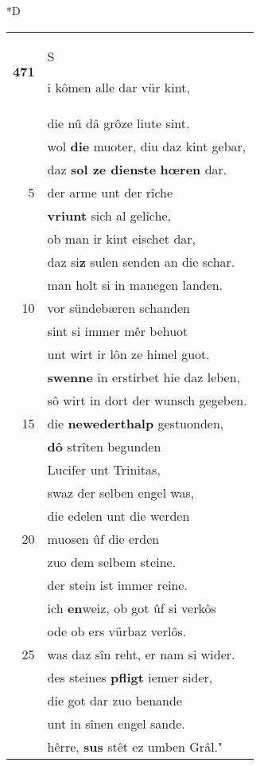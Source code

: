 \documentclass[8pt,a4paper,notitlepage]{article}
\begin{document}
\begin{table}[ht]
\begin{minipage}[t]{0.5\linewidth}
\small
\begin{center}*D
\end{center}
\begin{tabular}{rl}
\textbf{471} & \begin{large}S\end{large}i kômen alle dar vür kint,\\ 
 & die nû dâ grôze liute sint.\\ 
 & wol \textbf{die} muoter, diu daz kint gebar,\\ 
 & daz \textbf{sol ze dienste} \textbf{hœren} dar.\\ 
5 & der arme unt der rîche\\ 
 & \textbf{vriunt} sich al gelîche,\\ 
 & ob man ir kint eischet dar,\\ 
 & daz si\textbf{z} sulen senden an die schar.\\ 
 & man holt si in manegen landen.\\ 
10 & vor sündebæren schanden\\ 
 & sint si immer mêr behuot\\ 
 & unt wirt ir lôn ze himel guot.\\ 
 & \textbf{swenne} in erstirbet hie daz leben,\\ 
 & sô wirt in dort der wunsch gegeben.\\ 
15 & die \textbf{newederthalp} gestuonden,\\ 
 & \textbf{dô} strîten begunden\\ 
 & Lucifer unt Trinitas,\\ 
 & swaz der selben engel was,\\ 
 & die edelen unt die werden\\ 
20 & muosen ûf die erden\\ 
 & zuo dem selbem steine.\\ 
 & der stein ist immer reine.\\ 
 & ich \textbf{en}weiz, ob got ûf si verkôs\\ 
 & ode ob ers vürbaz verlôs.\\ 
25 & was daz sîn reht, er nam si wider.\\ 
 & des steines \textbf{pfligt} iemer sider,\\ 
 & die got dar zuo benande\\ 
 & unt in sînen engel sande.\\ 
 & hêrre, \textbf{sus} stêt ez umben Grâl."\\ 

\end{tabular}
\end{minipage}
\end{table}
\end{document}
